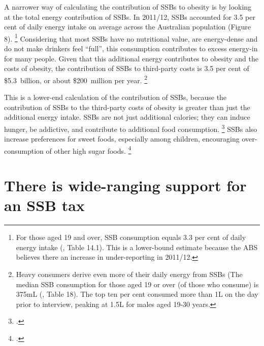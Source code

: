 \documentclass[embargoed]{grattan}
\begin{document}
A narrower way of calculating the contribution of SSBs to obesity is by looking at the total energy contribution of SSBs.
In 2011/12, SSBs accounted for 3.5 per cent of daily energy intake on average across the Australian population (Figure 8).%
\footnote{For those aged 19 and over, SSB consumption equals 3.3 per cent of daily energy intake (\textcite{ABS20144364055007AustralianHealth}, Table 14.1).
This is a lower-bound estimate because the ABS believes there an increase in under-reporting in 2011/12.} Considering that most SSBs have no nutritional value, are energy-dense and do not make drinkers feel ``full'', this consumption contributes to excess energy-in for many people.
Given that this additional energy contributes to obesity and the costs of obesity, the contribution of SSBs to third-party costs is 3.5 per cent of \$5.3~billion, or about \$200~million per year. \footnote{Heavy consumers derive even more of their daily energy from SSBs (The median SSB consumption for those aged 19 or over (of those who consume) is 375mL (\textcite{ABS2013436405503AustralianHealth}, Table 18).
The top ten per cent consumed more than 1L on the day prior to interview, peaking at 1.5L for males aged 19-30 years.}

This is a lower-end calculation of the contribution of SSBs, because the contribution of SSBs to the third-party costs of obesity is greater than just the additional energy intake.
SSBs are not just additional calories; they can induce hunger, be addictive, and contribute to additional food consumption.%
\footcites{Vartanian2007Effectssoftdrink}{Lennerz2013Effectsdietaryglycemic}{Schulte2015Currentconsiderationsregarding}{Fortuna2012obesityepidemicfood}{Popkin2012Sugarybeveragesrepresent}{Panel2014POLICYBRIEFoptions} SSBs also increase preferences for sweet foods, especially among children, encouraging over-consumption of other high sugar foods.%
\footcite{Popkin2012Sugarybeveragesrepresent}

\section{There is wide-ranging support for an SSB tax}\label{there-is-wide-ranging-support-for-an-ssb-tax}
\end{document}
